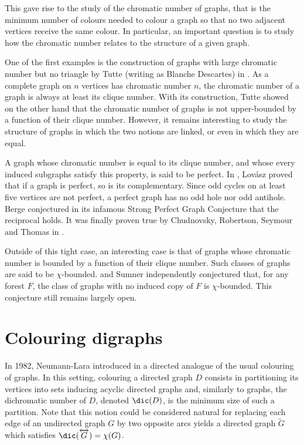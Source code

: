 This gave rise to the study of the chromatic number of graphs, that is the minimum number of colours needed to colour a graph so that no two adjacent vertices receive the same colour. In particular, an important question is to study how the chromatic number relates to the structure of a given graph.

\medskip

One of the first examples is the construction of graphs with large chromatic number but no triangle by Tutte (writing as Blanche Descartes) in \cite{D54}. As a complete graph on $n$ vertices has chromatic number $n$, the chromatic number of a graph is always at least its clique number. With its construction, Tutte showed on the other hand that the chromatic number of graphs is not upper-bounded by a function of their clique number. However, it remains interesting to study the structure of graphs in which the two notions are linked, or even in which they are equal.

\smallskip
A graph whose chromatic number is equal to its clique number, and whose every induced subgraphs satisfy this property, is said to be perfect. In \cite{L72}, Lov\'asz proved that if a graph is perfect, so is its complementary. Since odd cycles on at least five vertices are not perfect, a perfect graph has no odd hole nor odd antihole. Berge conjectured in its infamous Strong Perfect Graph Conjecture that the reciprocal holds. It was finally proven true by Chudnovsky, Robertson, Seymour and Thomas in \cite{Perfect}.

Outside of this tight case, an interesting case is that of graphs whose chromatic number is bounded by a function of their clique number. Such classes of graphs are said to be $\chi$-bounded. \Gya and Sumner independently conjectured that, for any forest $F$, the class of graphs with no induced copy of $F$ is $\chi$-bounded. This conjecture still remains largely open.

\section{Colouring digraphs}

In 1982, Neumann-Lara introduced in \cite{NL82} a directed analogue of the usual colouring of graphs. In this setting, colouring a directed graph $D$ consists in partitioning its vertices into sets inducing acyclic directed graphs and, similarly to graphs, the dichromatic number of $D$, denoted $\dic(D)$, is the minimum size of such a partition. Note that this notion could be considered natural for replacing each edge of an undirected graph $G$ by two opposite arcs yields a directed graph $\overleftrightarrow{G}$ which satisfies $\dic(\overleftrightarrow{G}) = \chi(G)$.

